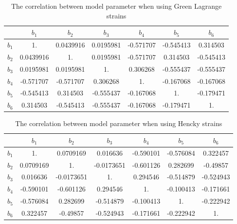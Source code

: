 \begin{table}[ht]
\caption{The correlation between model parameter when using Green Lagrange strains}
\begin{center}
\label{tb:correlationE}
\small 
\begin{tabular}{|l|cccccc|}
\hline
		 & $b_1$ & $b_2$& $b_3$& $b_4$& $b_5$& $b_6$ \\
\hline  
$b_1$	 & 1. & 0.0439916 & 0.0195981 & -0.571707 & -0.545413 & 0.314503 \\
$b_2$	 & 0.0439916 & 1. & 0.0195981 & -0.571707 & 0.314503 & -0.545413 \\
$b_3$	 & 0.0195981 & 0.0195981 & 1. & 0.306268 & -0.555437 & -0.555437 \\
$b_4$	 & -0.571707 & -0.571707 & 0.306268 & 1. & -0.167068 & -0.167068 \\
$b_5$	 & -0.545413 & 0.314503 & -0.555437 & -0.167068 & 1. & -0.179471 \\
$b_6$	 & 0.314503 & -0.545413 & -0.555437 & -0.167068 & -0.179471 & 1. \\
\hline
\end{tabular}
\normalsize
\end{center}
\end{table}


\begin{table}[ht]
\caption{The correlation between model parameter when using Hencky strains}
\begin{center}
\label{tb:correlationG}
\small
\begin{tabular}{|l|cccccc|}
\hline
		& $b_1$ & $b_2$& $b_3$& $b_4$& $b_5$& $b_6$ \\
\hline
$b_1$	& 1. & 0.0709169 & 0.016636 & -0.590101 & -0.576084 & 0.322457 \\
$b_2$	& 0.0709169 & 1. & -0.0173651 & -0.601126 & 0.282699 & -0.49857 \\
$b_3$	& 0.016636 & -0.0173651 & 1. & 0.294546 & -0.514879 & -0.524943 \\
$b_4$	& -0.590101 & -0.601126 & 0.294546 & 1. & -0.100413 & -0.171661 \\
$b_5$	& -0.576084 & 0.282699 & -0.514879 & -0.100413 & 1. & -0.222942 \\
$b_6$	& 0.322457 & -0.49857 & -0.524943 & -0.171661 & -0.222942 & 1. \\
\hline
\end{tabular}
\normalsize
\end{center}
\end{table}


